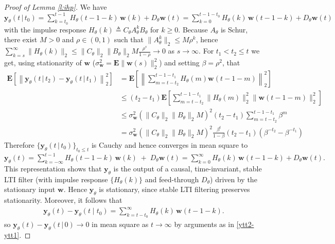 \documentclass{article}
\newcommand{\y}{\mathbf{y}}
\newcommand{\w}{\mathbf{w}}
\newcommand{\bE}{\mathbf{E}}
\begin{document}
\begin{proof}[Proof of Lemma \ref{l:ihp}]
We have
$
\y_\theta(t\,|\,t_0)=\sum_{k=t_0}^{t-1} H_\theta(t-1-k)\,\w(k)+D_\theta \w(t)=\sum_{k=0}^{t-1-t_0} H_\theta(k)\,\w(t-1-k)+D_\theta \w(t)
$
with the impulse response $H_\theta(k)\triangleq C_\theta A_\theta^{k}B_\theta$ for $k\ge 0$. Because $A_\theta$ is Schur, there exist $M>0$ and $\rho\in(0,1)$ such that
$\|A_\theta^{k}\|_2\le M\rho^k$, hence $\sum_{k=s}^\infty \|H_\theta(k)\|_2\leq\|C_\theta\|_2\|B_\theta\|_2M\frac{\rho^{s}}{1-\rho} \rightarrow 0$ as $s \rightarrow \infty$. 
For $t_1<t_2\leq t$ we get, using stationarity of $\w$ ($\sigma_\w^2=\bE\|\w(s)\|_2^2$) and setting $\beta=\rho^2$, that 
\begin{subequations}\label{ytt2-ytt1}
\begin{align}
\bE[\left\|\y_\theta(t\,|\,t_2)-\y_\theta(t\,|\,t_1)\right\|_2^2]
&=\bE\left[
\left\|\sum_{m=t-t_2}^{t-1-t_1}H_\theta(m)\w(t-1-m)\right\|_2^2
\right]\\
&\leq(t_2-t_1)\bE\left[\sum_{m=t-t_2}^{t-1-t_1}
\|H_\theta(m)\|_2^2\|\w(t-1-m)\|_2^2
\right]\\
&\leq\sigma_\w^2(\|C_\theta\|_2\|B_\theta\|_2M)^2(t_2-t_1)\sum_{m=t-t_2}^{t-1-t_1}\beta^m\\
&=\sigma_\w^2(\|C_\theta\|_2\|B_\theta\|_2M)^2\frac{\beta^t}{1-\beta}
(t_2-t_1)(\beta^{-t_2}-\beta^{-t_1})
\end{align}
\end{subequations}
Therefore $\{\y_\theta(t\,|\,t_0)\}_{t_0\le t}$ is Cauchy and hence converges in mean square to
$
\y_\theta(t)= \sum_{k=-\infty}^{t-1} H_\theta(t-1-k)\,\w(k) \;+\; D_\theta \w(t)=\sum_{k=0}^{\infty} H_\theta(k)\,\w(t-1-k)+D_\theta \w(t).
$
This representation shows that $\y_\theta$ is the output of a causal, time-invariant, stable LTI filter
(with impulse response $\{H_\theta(k)\}$ and feed-through $D_\theta$) driven by the stationary input $\w$. Hence $\y_\theta$ is stationary, since stable LTI filtering preserves stationarity. Moreover, it follows that
\begin{align}\label{ytytt0}
\y_\theta(t) - \y_\theta(t\mid t_0) 
=  \sum_{k = t - t_0}^{\infty} H_\theta(k)\, \w(t-1-k).
\end{align}
so $\y_\theta(t)-\y_\theta(t\,|\,0)\to 0$ in mean square as $t\to\infty$ by arguments as in \eqref{ytt2-ytt1}. 



\end{proof}
\end{document}
